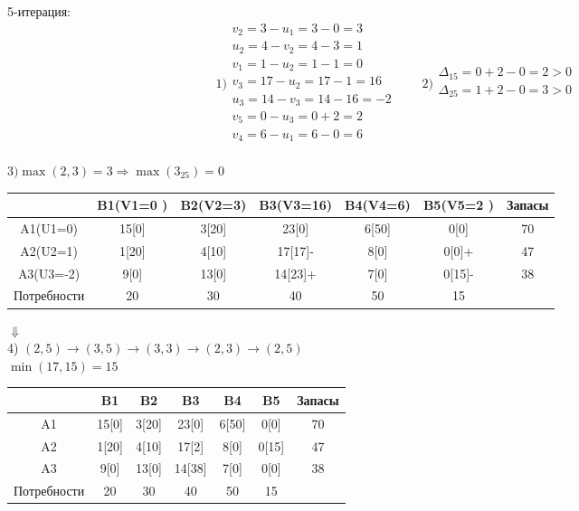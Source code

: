 \documentclass[a4paper, 12pt]{article}
\begin{document}
5-итерация:\\
\begin{equation*}
  1)\begin{split}
    v_2= 3 - u_1 = 3-0 = 3\\
    u_2= 4 - v_2 = 4-3 = 1\\
    v_1= 1 - u_2 = 1-1 = 0\\
    v_3= 17 - u_2 = 17-1 = 16\\
    u_3= 14 - v_3 = 14-16 = -2\\
    v_5= 0 - u_3 = 0+2 = 2\\
    v_4= 6 - u_1 = 6-0 = 6\\
  \end{split}
  \qquad  
  2)\begin{split}
    \Delta_{15} =0+2-0=2> 0 \\
    \Delta_{25} =1+2-0=3> 0 \\
  \end{split}
\end{equation*}

\begin{math}
  3) \max(2,3)= 3 \Rightarrow \max(3_{25}) = 0
\end{math}
\begin{table}[H]
\centering
\begin{tabular}{|c|c|c|c|c|c|c|}
\hline
            & B1(V1=0 )& B2(V2=3) & B3(V3=16) & B4(V4=6)  & B5(V5=2 ) & Запасы \\ \hline
A1(U1=0)    & 15[0]    & 3[20]    & 23[0]     & 6[50]     & 0[0]      & 70     \\ \hline
A2(U2=1)    & 1[20]    & 4[10]    & 17[17]-   & 8[0]      & 0[0]+     & 47     \\ \hline
A3(U3=-2)   & 9[0]     & 13[0]    & 14[23]+   & 7[0]      & 0[15]-    & 38     \\ \hline
Потребности & 20       & 30       & 40        & 50        & 15        &        \\ \hline
\end{tabular}
\end{table}

\begin{center}
  $\Downarrow$\\
  4) $(2,5)\rightarrow(3,5)\rightarrow(3,3)\rightarrow(2,3)\rightarrow(2,5)$\\
  $\min(17,15) = 15$
\end{center}
\begin{table}[H]
\centering
\begin{tabular}{|c|c|c|c|c|c|c|}
\hline
     & B1       & B2       & B3        & B4        & B5        & Запасы \\ \hline
A1   & 15[0]    & 3[20]    & 23[0]     & 6[50]     & 0[0]      & 70     \\ \hline
A2   & 1[20]    & 4[10]    & 17[2]     & 8[0]      & 0[15]     & 47     \\ \hline
A3   & 9[0]     & 13[0]    & 14[38]    & 7[0]      & 0[0]      & 38     \\ \hline
Потребности & 20       & 30       & 40        & 50        & 15        &        \\ \hline
\end{tabular}
\end{table}
\end{document}
